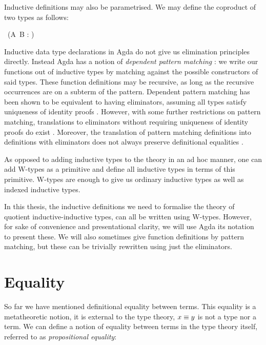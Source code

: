 Inductive definitions may also be parametrised. We may define the
coproduct of two types as follows:
\begin{datatype}{\coproduct{\_}{\_}\ (A\ B : \Set)}{\Set}
   \\
\end{datatype}

Inductive data type declarations in Agda do not give us elimination
principles directly. Instead Agda has a notion of \emph{dependent
  pattern matching} \cite{Coquand1992}: we write our functions out of
inductive types by matching against the possible constructors of said
types. These function definitions may be recursive, as long as the
recursive occurrences are on a subterm of the pattern. Dependent
pattern matching has been shown to be equivalent to having
eliminators, assuming all types satisfy uniqueness of identity proofs
\cite{Goguen2006}. However, with some further restrictions on pattern
matching, translations to eliminators without requiring uniqueness of
identity proofs do exist \cite{Cockx2014}. Moreover, the translation
of pattern matching definitions into definitions with eliminators does
not always preserve definitional equalities \cite{McBride2006ii}.

As opposed to adding inductive types to the theory in an ad hoc
manner, one can add W-types as a primitive and define all inductive
types in terms of this primitive. W-types are enough to give us
ordinary inductive types as well as indexed inductive types.

In this thesis, the inductive definitions we need to formalise the
theory of quotient inductive-inductive types, can all be written using
W-types. However, for sake of convenience and presentational clarity,
we will use Agda its notation to present these. We will also sometimes
give function definitions by pattern matching, but these can be
trivially rewritten using just the eliminators.

\section{Equality}

So far we have mentioned definitional equality between terms. This
equality is a metatheoretic notion, it is external to the type theory,
\ie $x \equiv y$ is not a type nor a term. We can define a notion of
equality between terms in the type theory itself, referred to as
\emph{propositional equality}:

